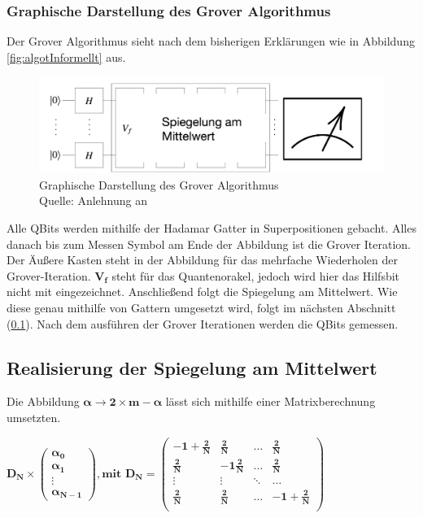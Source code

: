 \subsubsection{Graphische Darstellung des Grover Algorithmus}
Der Grover Algorithmus sieht nach dem bisherigen Erklärungen wie in Abbildung \ref{fig:algotInformellt} aus.
\begin{figure}[hbtp]
	\centering
	\includegraphics[width=1\textwidth]{figures/algoInformell.png}
	\caption{Graphische Darstellung des Grover Algorithmus \\ Quelle: Anlehnung an \cite[S. 146]{Ho17}}
	\label{fig:algoInformell}
\end{figure}
Alle QBits werden mithilfe der Hadamar Gatter in Superpositionen gebacht. Alles danach bis zum Messen Symbol am Ende der Abbildung ist die Grover Iteration.
Der Äußere Kasten steht in der Abbildung für das mehrfache Wiederholen der Grover-Iteration. $\mathbf{V_f}$ steht für das Quantenorakel, jedoch wird hier das Hilfsbit nicht mit eingezeichnet. Anschließend folgt die Spiegelung am Mittelwert. Wie diese genau mithilfe von Gattern umgesetzt wird, folgt im nächsten Abschnitt (\ref{sec:realiserung}). Nach dem ausführen der Grover Iterationen werden die QBits gemessen.
\subsection{Realisierung der Spiegelung am Mittelwert}
\label{sec:realiserung}
Die Abbildung $\mathbf{\alpha \rightarrow 2 \times m - \alpha}$ lässt sich mithilfe einer Matrixberechnung umsetzten.
\begin{center}
	$\mathbf{D_N \times 
	\begin{pmatrix}
			\alpha_0 \\ \alpha_1 \\ \vdots \\  \alpha_{N-1}
	\end{pmatrix}, \text{mit } D_N = 
	\begin{pmatrix}
			-1 + \frac{2}{N} & \frac{2}{N} & \dots& \frac{2}{N} \\
			\frac{2}{N} & -1 \frac{2}{N} & \dots& \frac{2}{N} \\
			\vdots & \vdots & \ddots& \dots \\
			 \frac{2}{N} & \frac{2}{N} & \dots& -1+ \frac{2}{N} \\
	\end{pmatrix}}$
\end{center}
